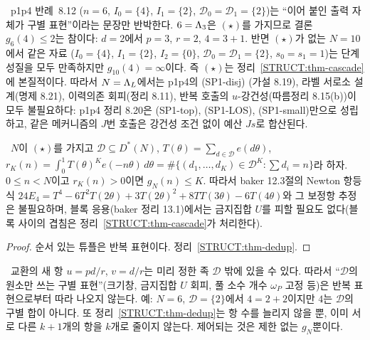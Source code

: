 \begin{remark}[p1p4 반례 8.12와 설계 조건의 제거]\label{STRUCT:rem-8-12}
\PROVED\ p1p4 반례~8.12 ($n=6$, $I_0=\{4\}$, $I_1=\{2\}$, $\mathcal D_0=\mathcal D_1=\{2\}$)는 ``이어 붙인 출력 자체가 구별 표현''이라는 문장만 반박한다. $6=\Lambda_3$은 $(\star)$를 가지므로 결론 $g_6(4)\le2$는 참이다: $d=2$에서 $p=3$, $r=2$, $4=3+1$.
반면 $(\star)$가 없는 $N=10$에서 같은 자료 ($I_0=\{4\}$, $I_1=\{2\}$, $I_2=\{0\}$, $\mathcal D_0=\mathcal D_1=\{2\}$, $s_0=s_1=1$)는 단계성질을 모두 만족하지만 $g_{10}(4)=\infty$이다. 즉 $(\star)$는 정리~\ref{STRUCT:thm-cascade}에 본질적이다.
따라서 $N=\Lambda_L$에서는 p1p4의 (SP1-disj) (가설 8.19), 라벨 서로소 설계(명제 8.21), 이력의존 회피(정리 8.11), 반복 호출의 $u$-강건성(따름정리 8.15(b))이 모두 불필요하다: p1p4 정리 8.20은 (SP1-top), (SP1-LOS), (SP1-small)만으로 성립하고, 같은 메커니즘의 $J$번 호출은 강건성 조건 없이 예산 $J s$로 합산된다.
\end{remark}

\begin{corollary}\label{STRUCT:cor-newton}
\PROVED\ $N$이 $(\star)$를 가지고 $\mathcal D\subseteq D^*(N)$, $T(\theta)=\sum_{d\in\mathcal D}e(d\theta)$, $r_K(n)=\int_0^1T(\theta)^Ke(-n\theta)\,d\theta=\#\{(d_1,\dots,d_K)\in\mathcal D^K:\sum d_i=n\}$라 하자. $0\le n<N$이고 $r_K(n)>0$이면 $g_N(n)\le K$.
따라서 baker 12.3절의 Newton 항등식 $24E_4=T^4-6T^2T(2\theta)+3T(2\theta)^2+8TT(3\theta)-6T(4\theta)$와 그 보정항 추정은 불필요하며, 블록 응용(baker 정리 13.1)에서는 금지집합 $U$를 피할 필요도 없다(블록 사이의 겹침은 정리~\ref{STRUCT:thm-cascade}가 처리한다).
\end{corollary}
\begin{proof}
순서 있는 튜플은 반복 표현이다. 정리~\ref{STRUCT:thm-dedup}.
\end{proof}

\begin{remark}\label{STRUCT:rem-not-preserved}
\PROVED\ 교환의 새 항 $u=pd/r$, $v=d/r$는 미리 정한 족 $\mathcal D$ 밖에 있을 수 있다. 따라서 ``$\mathcal D$의 원소만 쓰는 구별 표현''(크기창, 금지집합 $U$ 회피, 풀 소수 개수 $\omega_P$ 고정 등)은 반복 표현으로부터 따라 나오지 않는다. 예: $N=6$, $\mathcal D=\{2\}$에서 $4=2+2$이지만 $4$는 $\mathcal D$의 구별 합이 아니다.
또 정리~\ref{STRUCT:thm-dedup}는 항 수를 늘리지 않을 뿐, 이미 서로 다른 $k+1$개의 항을 $k$개로 줄이지 않는다. 제어되는 것은 제한 없는 $g_N$뿐이다.
\end{remark}

